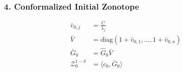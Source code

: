 \subsubsection*{4. Conformalized Initial Zonotope}
\begin{align*}
\bar{v}_{0,j} &= \frac{C}{\lambda_j} \\
\bar{V} &= \text{diag}\left(1 + \bar{v}_{0,1}, \dots, 1 + \bar{v}_{0,n}\right) \\
\bar{G}_0 &= \hat{G}_0 \bar{V} \\
\mathcal{Z}_0^{1-\delta} &= \langle c_0, \bar{G}_0 \rangle
\end{align*}
